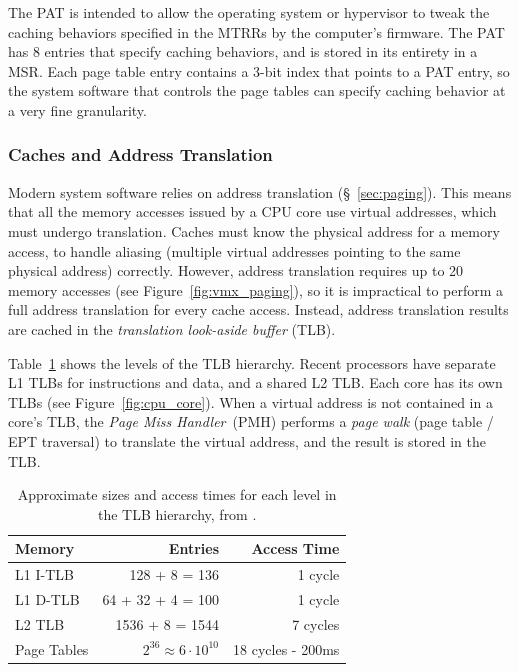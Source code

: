 The PAT is intended to allow the operating system or hypervisor to tweak the
caching behaviors specified in the MTRRs by the computer's firmware. The PAT
has 8 entries that specify caching behaviors, and is stored in its entirety in
a MSR. Each page table entry contains a 3-bit index that points to a PAT entry,
so the system software that controls the page tables can specify caching
behavior at a very fine granularity.


\subsubsection{Caches and Address Translation}
\label{sec:tlbs}

Modern system software relies on address translation (\S~\ref{sec:paging}).
This means that all the memory accesses issued by a CPU core use virtual
addresses, which must undergo translation. Caches must know the physical
address for a memory access, to handle aliasing (multiple virtual addresses
pointing to the same physical address) correctly. However, address translation
requires up to 20 memory accesses (see Figure~\ref{fig:vmx_paging}), so it is
impractical to perform a full address translation for every cache access.
Instead, address translation results are cached in the \textit{translation
look-aside buffer} (TLB).

Table~\ref{fig:tlb_timings} shows the levels of the TLB hierarchy. Recent
processors have separate L1 TLBs for instructions and data, and a shared L2
TLB. Each core has its own TLBs (see Figure~\ref{fig:cpu_core}). When a virtual
address is not contained in a core's TLB, the \textit{Page Miss Handler}~(PMH)
performs a \textit{page walk} (page table / EPT traversal) to translate the
virtual address, and the result is stored in the TLB.

\begin{table}[hbt]
  \centering
  \begin{tabular}{| l | r | r |}
  \hline
  \textbf{Memory} & \textbf{Entries} & \textbf{Access Time}\\
  \hline
  L1 I-TLB & 128 + 8 = 136 & 1 cycle \\
  \hline
  L1 D-TLB & 64 + 32 + 4 = 100 & 1 cycle \\
  \hline
  L2 TLB & 1536 + 8 = 1544 & 7 cycles \\
  \hline
  Page Tables & $2^{36} \approx 6 \cdot 10^{10} $ & 18 cycles - 200ms \\
  \hline
  \end{tabular}
  \caption{
    Approximate sizes and access times for each level in the TLB hierarchy,
    from \cite{7zip2014haswell}.
  }
  \label{fig:tlb_timings}
\end{table}

